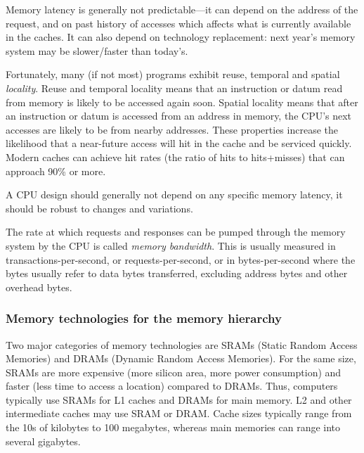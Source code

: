 Memory latency is generally not predictable---it can depend on the
address of the request, and on past history of accesses which affects
what is currently available in the caches.  It can also depend on
technology replacement: next year's memory system may be slower/faster
than today's.

Fortunately, many (if not most) programs exhibit reuse, temporal and
spatial \emph{locality}. Reuse and temporal locality means that an
instruction or datum read from memory is likely to be accessed again
soon.  Spatial locality means that after an instruction or datum is
accessed from an address in memory, the CPU's next accesses are likely
to be from nearby addresses.  These properties increase the likelihood
that a near-future access will hit in the cache and be serviced
quickly.  Modern caches can achieve hit rates (the ratio of hits to
hits+misses) that can approach 90\% or more.

A CPU design should generally not depend on any specific memory
latency, {\ie} it should be robust to changes and variations.


The rate at which requests and responses can be pumped through the
memory system by the CPU is called \emph{memory bandwidth}.  This is
usually measured in transactions-per-second, or requests-per-second,
or in bytes-per-second where the bytes usually refer to data bytes
transferred, excluding address bytes and other overhead bytes.


\subsubsection{Memory technologies for the memory hierarchy}



Two major categories of memory technologies are SRAMs (Static Random
Access Memories) and DRAMs (Dynamic Random Access Memories).  For the
same size, SRAMs are more expensive (more silicon area, more power
consumption) and faster (less time to access a location) compared to
DRAMs.  Thus, computers typically use SRAMs for L1 caches and DRAMs
for main memory. L2 and other intermediate caches may use SRAM or
DRAM.  Cache sizes typically range from the 10s of kilobytes to 100
megabytes, whereas main memories can range into several gigabytes.

